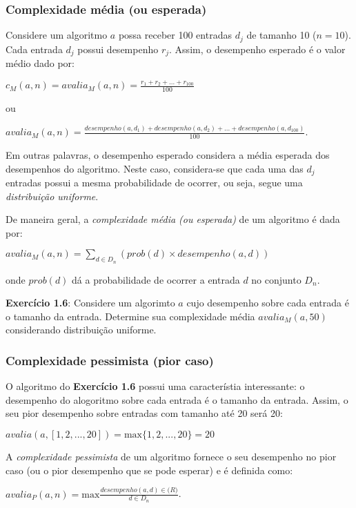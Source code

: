 \documentclass{article}
\begin{document}
    \subsubsection{Complexidade média (ou esperada)}


    Considere um algoritmo \(a\) possa receber 100 entradas \(d_j\) de
tamanho 10 (\(n = 10\)). Cada entrada \(d_j\) possui desempenho \(r_j\).
Assim, o desempenho esperado é o valor médio dado por:

\(c_M(a, n) = avalia_M(a, n) = \frac{r_1 + r_2 + ... + r_{100}}{100}\)

ou

\(avalia_M(a, n) = \frac{desempenho(a, d_1) + desempenho(a, d_2) + ... + desempenho(a, d_{100})}{100}\).

Em outras palavras, o desempenho esperado considera a média esperada dos
desempenhos do algoritmo. Neste caso, considera-se que cada uma das
\(d_j\) entradas possui a mesma probabilidade de ocorrer, ou seja, segue
uma \emph{distribuição uniforme}.

De maneira geral, a \emph{complexidade média (ou esperada)} de um
algoritmo é dada por:

\(avalia_M(a, n) = \sum_{d \in D_n}{} (prob(d) \times desempenho(a, d))\)

onde \(prob(d)\) dá a probabilidade de ocorrer a entrada \(d\) no
conjunto \(D_n\).

\textbf{Exercício 1.6}: Considere um algorimto \(a\) cujo desempenho
sobre cada entrada é o tamanho da entrada. Determine sua complexidade
média \(avalia_M(a, 50)\) considerando distribuição uniforme.


    \subsubsection{Complexidade pessimista (pior caso)}


    O algoritmo do \textbf{Exercício 1.6} possui uma característia
interessante: o desempenho do alogoritmo sobre cada entrada é o tamanho
da entrada. Assim, o seu pior desempenho sobre entradas com tamanho até
20 será 20:

\(avalia(a, [1, 2, ..., 20]) = {\mathrm{max}} \{1, 2, ..., 20\} = 20\)

A \emph{complexidade pessimista} de um algoritmo fornece o seu
desempenho no pior caso (ou o pior desempenho que se pode esperar) e é
definida como:

\(avalia_P(a, n) = \mathrm{max} \frac{desempenho(a, d) \in \mathrm(R)}{d \in D_n}\).
\end{document}
